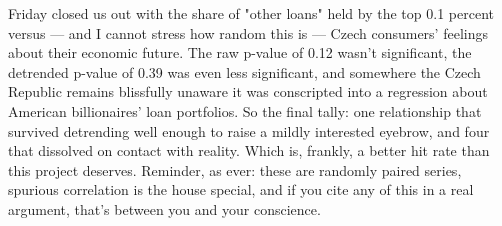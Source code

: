 Friday closed us out with the share of "other loans" held by the top 0.1 percent versus — and I cannot stress how random this is — Czech consumers' feelings about their economic future. The raw p-value of 0.12 wasn't significant, the detrended p-value of 0.39 was even less significant, and somewhere the Czech Republic remains blissfully unaware it was conscripted into a regression about American billionaires' loan portfolios. So the final tally: one relationship that survived detrending well enough to raise a mildly interested eyebrow, and four that dissolved on contact with reality. Which is, frankly, a better hit rate than this project deserves. Reminder, as ever: these are randomly paired series, spurious correlation is the house special, and if you cite any of this in a real argument, that's between you and your conscience.
